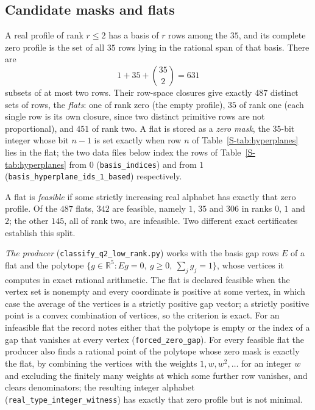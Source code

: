 \documentclass[11pt,reqno]{amsart}
\theoremstyle{plain}
\theoremstyle{definition}
\theoremstyle{plain}
\newcommand{\R}{\mathbb{R}}
\theoremstyle{plain}
\theoremstyle{plain}
\theoremstyle{plain}
\theoremstyle{plain}
\theoremstyle{plain}
\theoremstyle{definition}
\theoremstyle{definition}
\theoremstyle{definition}
\theoremstyle{plain}
\begin{document}
\subsection{Candidate masks and flats}\label{S-supp:flats}
A real profile of rank $r\le2$ has a basis of $r$ rows among the $35$, and
its complete zero profile is the set of all $35$ rows lying in the rational
span of that basis. There are
\[
 1+35+\binom{35}2=631
\]
subsets of at most two rows. Their row-space closures give exactly $487$
distinct sets of rows, the \emph{flats}: one of rank zero (the empty
profile), $35$ of rank one (each single row is its own closure, since two
distinct primitive rows are not proportional), and $451$ of rank two. A
flat is stored as a \emph{zero mask}, the $35$-bit integer whose bit
$n-1$ is set exactly when row $n$ of Table~\ref{S-tab:hyperplanes} lies in
the flat; the two data files below index the rows of Table~\ref{S-tab:hyperplanes}
from $0$ (\texttt{basis\_indices}) and from $1$
(\texttt{basis\_hyperplane\_ids\_1\_based}) respectively.

A flat is \emph{feasible} if some strictly increasing real alphabet has
exactly that zero profile. Of the $487$ flats, $342$ are feasible, namely
$1$, $35$ and $306$ in ranks $0$, $1$ and $2$; the other $145$, all of rank
two, are infeasible. Two different exact certificates establish this
split.

\emph{The producer} (\texttt{classify\_q2\_low\_rank.py}) works with the
basis gap rows $E$ of a flat and the polytope
$\{g\in\R^5:Eg=0,\ g\ge0,\ \sum_jg_j=1\}$, whose vertices it computes in
exact rational arithmetic. The flat is declared feasible when the vertex
set is nonempty and every coordinate is positive at some vertex, in which
case the average of the vertices is a strictly positive gap vector; a
strictly positive point is a convex combination of vertices, so the
criterion is exact. For an infeasible flat the record notes either that
the polytope is empty or the index of a gap that vanishes at every vertex
(\texttt{forced\_zero\_gap}). For every feasible flat the producer also
finds a rational point of the polytope whose zero mask is exactly the flat,
by combining the vertices with the weights $1,w,w^2,\ldots$ for an integer
$w$ and excluding the finitely many weights at which some further row
vanishes, and clears denominators; the resulting integer alphabet
(\texttt{real\_type\_integer\_witness}) has exactly that zero profile but
is not minimal.
\end{document}
